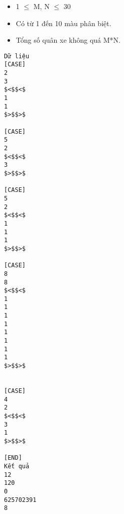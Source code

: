 \begin{itemize}
	\item     1  $\le$  M, N  $\le$  30   
	\item     Có từ 1 đến 10 màu phân biệt.   
	\item     Tổng số quân xe không quá M*N.   
\end{itemize}
\begin{verbatim}
Dữ liệu
[CASE]
2
3
$<$$<$
1
1
$>$$>$

[CASE]
5
2
$<$$<$
3
$>$$>$

[CASE]
5
2
$<$$<$
1
1
1
$>$$>$

[CASE]
8
8
$<$$<$
1
1
1
1
1
1
1
1
$>$$>$


[CASE]
4
2
$<$$<$
3
1
$>$$>$

[END]
Kết quả
12
120
0
625702391
8
\end{verbatim}